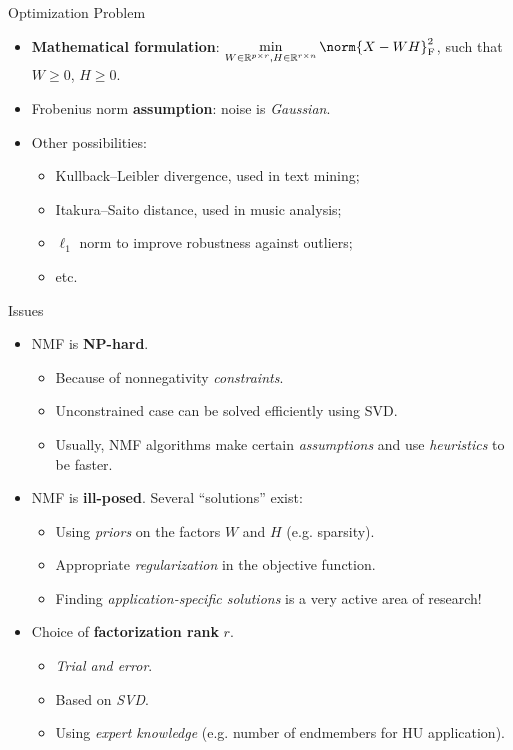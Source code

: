 \begin{frame}{Optimization Problem}
\begin{itemize}
\item<1-> \textbf{Mathematical formulation}: \(\displaystyle \min_{W \in \mathbb{R}^{p \times r}, H \in \mathbb{R}^{r \times n}} \norm{X - WH}^2_{\textnormal{F}}\), such that \(W \geqslant 0\), \(H \geqslant 0\).
\item<2-> Frobenius norm \textbf{assumption}: noise is \emph{Gaussian}.
\item<3-> Other possibilities:
\begin{itemize}
    \item Kullback--Leibler divergence, used in text mining;
    \item Itakura--Saito distance, used in music analysis;
    \item \(\ell_1\) norm to improve robustness against outliers;
    \item etc.
\end{itemize}
\end{itemize}
\end{frame}

\begin{frame}{Issues}
\begin{itemize}
\item<1-> NMF is \textbf{NP-hard}.
\begin{itemize}
    \item Because of nonnegativity \emph{constraints}.
    \item Unconstrained case can be solved efficiently using SVD.
    \item Usually, NMF algorithms make certain \emph{assumptions} and use \emph{heuristics} to be faster.
\end{itemize}
\item<2-> NMF is \textbf{ill-posed}. Several ``solutions'' exist:
\begin{itemize}
    \item Using \emph{priors} on the factors \(W\) and \(H\) (e.g. sparsity).
    \item Appropriate \emph{regularization} in the objective function.
    \item Finding \emph{application-specific solutions} is a very active area of research!
\end{itemize}
\item<3-> Choice of \textbf{factorization rank} \(r\).
\begin{itemize}
    \item \emph{Trial and error}.
    \item Based on \emph{SVD}.
    \item Using \emph{expert knowledge} (e.g. number of endmembers for HU application).
\end{itemize}
\end{itemize}
\end{frame}